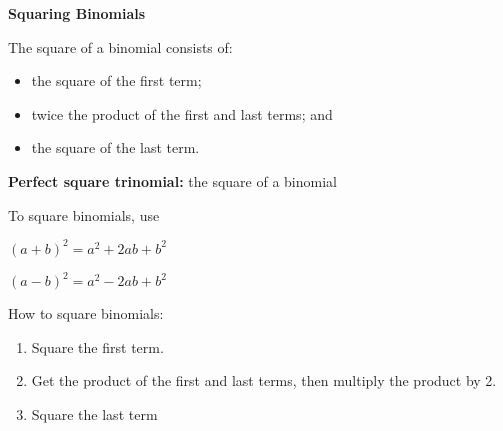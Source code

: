\begin{center}
\textbf{Squaring Binomials}
\end{center}

\vspce

The square of a binomial consists of:
\begin{itemize}
\item the square of the first term;
\item twice the product of the first and last terms; and 
\item the square of the last term.
\end{itemize}

\vspce

\textbf{Perfect square trinomial:} the square of a binomial 

\vspce

To square binomials, use

\vspce

\begin{center}
$(a + b)^{2} = a^{2} + 2ab + b^{2}$

\vspce

$(a - b)^{2} = a^{2} - 2ab + b^{2}$
\end{center}

\vspce

How to square binomials: 
\begin{enumerate}
\item Square the first term. 
\item	Get the product of the first and last terms, then multiply the product by 2.
\item	Square the last term
\end{enumerate}
